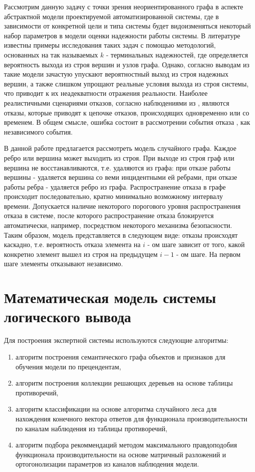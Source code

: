 Рассмотрим данную задачу с точки зрения неориентированного графа в аспекте абстрактной модели проектируемой автоматизированной системы, где в зависимости от конкретной цели и типа системы будет видоизменяться некоторый набор параметров в модели оценки надежности работы системы. В литературе известны примеры исследования таких задач с помощью методологий, основанных на так называемых $k$ - терминальных надежностей, где определяется вероятность выхода из строя вершин и узлов графа. Однако, согласно выводам из \cite{groupotkazy} такие модели зачастую упускают вероятностный выход из строя надежных вершин, а также слишком упрощают реальные условия выхода из строя системы, что приводит к их неадекватности отражения реальности. 
Наиболее реалистичными сценариями отказов, согласно наблюдениями из \cite{groupotkazy}, являются отказы, которые приводят к цепочке отказов, происходящих одновременно или со временем. В общем смысле, ошибка состоит в рассмотрении события отказа , как независимого события.

В данной работе предлагается рассмотреть модель случайного графа.  
Каждое ребро или вершина может выходить из строя. При выходе из строя граф или вершина не восстанавливаются, т.е. удаляются из графа: при отказе работы вершины - удаляется вершина со веми инцидентными ей ребрами, при отказе работы ребра - удаляется ребро из графа. Распространение отказа в графе происходит последовательно, кратно минимально возможному интервалу времени. Допускается наличие некоторого порогового уровня распространения отказа в системе, после которого распространение отказа блокируется автоматически, например, посредством некоторого механизма безопасности. 
Таким образом, модель представляется в следующем виде:
отказы происходят каскадно, т.е. вероятность отказа элемента на $i$ - ом шаге зависит от того, какой конкретно элемент вышел из строя на предыдущем $i - 1$ - ом шаге.
На первом шаге элементы отказывают независимо. 


\section{Математическая модель системы логического вывода}\label{sec:ch2/sec3}

Для построения экспертной системы используются следующие алгоритмы:
\begin{enumerate}
	\item алгоритм построения семантического графа объектов и признаков для обучения модели по прецендентам,
	\item алгоритм построения коллекции решающих деревьев на основе таблицы противоречий,
	\item алгоритм классификации на основе алгоритма случайного леса для нахождения конечного вектора ответов для функционала производительности по каналам наблюдения из таблицы противоречий,
	\item алгоритм подбора рекоммендаций методом максимального правдоподобия функционала производительности на основе матричный разложений и  ортогонолизации параметров из каналов наблюдения модели.
\end{enumerate}

